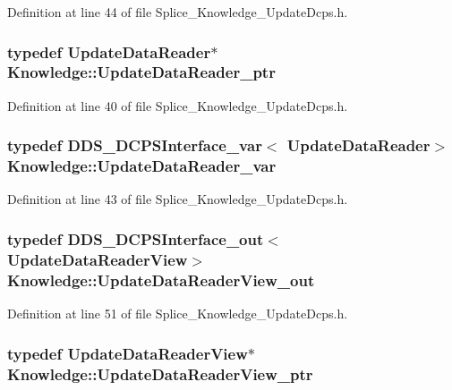 Definition at line 44 of file Splice\_\-Knowledge\_\-UpdateDcps.h.

\hypertarget{namespaceKnowledge_a6c868767b12725ee116fae580947c9d9}{
\subsubsection[{UpdateDataReader\_\-ptr}]{\setlength{\rightskip}{0pt plus 5cm}typedef {\bf UpdateDataReader}$\ast$ {\bf Knowledge::UpdateDataReader\_\-ptr}}}
\label{da/d50/namespaceKnowledge_a6c868767b12725ee116fae580947c9d9}


Definition at line 40 of file Splice\_\-Knowledge\_\-UpdateDcps.h.

\hypertarget{namespaceKnowledge_acbf12106aaac4bdb65b120d8c2f38757}{
\subsubsection[{UpdateDataReader\_\-var}]{\setlength{\rightskip}{0pt plus 5cm}typedef DDS\_\-DCPSInterface\_\-var$<$ {\bf UpdateDataReader}$>$ {\bf Knowledge::UpdateDataReader\_\-var}}}
\label{da/d50/namespaceKnowledge_acbf12106aaac4bdb65b120d8c2f38757}


Definition at line 43 of file Splice\_\-Knowledge\_\-UpdateDcps.h.

\hypertarget{namespaceKnowledge_a75c22166ceaacc184d9853ba3dfbff04}{
\subsubsection[{UpdateDataReaderView\_\-out}]{\setlength{\rightskip}{0pt plus 5cm}typedef DDS\_\-DCPSInterface\_\-out$<$ {\bf UpdateDataReaderView}$>$ {\bf Knowledge::UpdateDataReaderView\_\-out}}}
\label{da/d50/namespaceKnowledge_a75c22166ceaacc184d9853ba3dfbff04}


Definition at line 51 of file Splice\_\-Knowledge\_\-UpdateDcps.h.

\hypertarget{namespaceKnowledge_af5ef7684556c57687dcb741089bb32ec}{
\subsubsection[{UpdateDataReaderView\_\-ptr}]{\setlength{\rightskip}{0pt plus 5cm}typedef {\bf UpdateDataReaderView}$\ast$ {\bf Knowledge::UpdateDataReaderView\_\-ptr}}}
\label{da/d50/namespaceKnowledge_af5ef7684556c57687dcb741089bb32ec}


